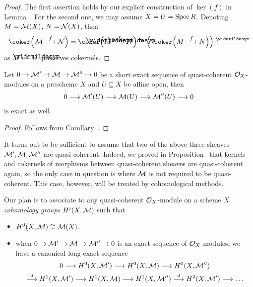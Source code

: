 \documentclass[a4paper,parskip=half,numbers=enddot, DIV=12]{scrreprt}
\begin{document}
\begin{proof}
	The first assertion holds by our explicit construction of $\ker(f)$ in Lemma~. For the second one, we may assume $X=U=\operatorname{Spec} R$. Denoting $M=\mathcal{M}(X)$, $N=\mathcal{N}(X)$, then
	\begin{align*}
		\coker\Big(\Mm\morphism[f]\Nn\Big)=\coker\Big(\snake{M}\morphism[f]\snake{N}\Big)\cong\Big(\coker\Big(M\morphism[f]N\Big)\Big)^\qcmod
	\end{align*}
	as $M\mapsto\snake{M}$ preserves cokernels.
\end{proof}
\begin{cor}
	Let $0\morphism\Mm'\morphism\Mm\morphism\Mm''\morphism0$ be a short exact sequence of quasi-coherent $\mathcal{O}_X$-modules on a prescheme $X$ and $U\subseteq X$ be affine open, then 
	\begin{align*}
		0\morphism\Mm'(U)\morphism\Mm(U)\morphism\Mm''(U)\morphism 0
	\end{align*}
	is exact as well.
\end{cor}
\begin{proof}
	Follows from Corollary~.
\end{proof}
\begin{rem*}
	It turns out to be sufficient to assume that two of the above three sheaves $\mathcal{M}',\mathcal{M},\mathcal{M}''$ are quasi-coherent. Indeed, we proved in Proposition~ that kernels and cokernels of morphisms between quasi-coherent sheaves are quasi-coherent again, so the only case in question is where $\mathcal{M}$ is not required to be quasi-coherent. This case, however, will be treated by cohomological methods.
\end{rem*}
Our plan is to associate to any quasi-coherent $\mathcal{O}_X$-module on a scheme $X$ \emph{cohomology groups} $H^i(X,\mathcal{M})$ such that
\begin{itemize}
	\item $H^0(X,\mathcal{M})\cong\mathcal{M}(X)$.
	\item when $0\morphism\Mm'\morphism\Mm\morphism\Mm''\morphism0$ is an exact sequence of $\mathcal{O}_X$-modules, we have a canonical long exact sequence
	\begin{multline*}
		0\morphism H^0(X,\Mm')\morphism H^0(X,\Mm)\morphism H^0(X,\Mm'')\\
		\morphism[d] H^1(X,\Mm')\morphism H^1(X,\Mm)\morphism H^1(X,\Mm'')\morphism[d]H^2(X,\Mm')\morphism\ldots
	\end{multline*}
\end{itemize}
\end{document}
